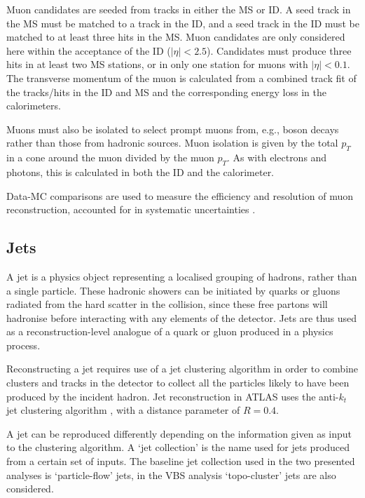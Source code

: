Muon candidates are seeded from tracks in either the \ac{MS} or \ac{ID}.  A seed
track in the \ac{MS} must be matched to a track in the \ac{ID}, and a seed track
in the \ac{ID} must be matched to at least three hits in the \ac{MS}.
Muon candidates are only considered here within the acceptance of the \ac{ID}
($|\eta| < 2.5$). Candidates must produce three hits in at least two \ac{MS}
stations, or in only one station for muons with $|\eta|<0.1$.
The transverse momentum of the muon is calculated from a combined track fit of the
tracks/hits in the \ac{ID} and \ac{MS} and the corresponding energy loss in the
calorimeters.

Muons must also be isolated to select prompt muons from, e.g., boson decays
rather than those from hadronic sources. Muon isolation is given by the total
$p_T$ in a cone around the muon divided by the muon $p_T$. As with electrons and
photons, this is calculated in both the \ac{ID} and the calorimeter.

Data-MC comparisons are used to measure the efficiency and
resolution of muon reconstruction, accounted for in systematic uncertainties
\cite{MuonReco2021}.


\subsection{Jets}
\label{sec:methods-reconstruction-jet}

A jet is a physics object representing a localised grouping of hadrons, rather
than a single particle. These hadronic showers can be initiated by quarks or
gluons radiated from the hard scatter in the collision, since these free partons
will hadronise before interacting with any elements of the detector. Jets are
thus used as a reconstruction-level analogue of a quark or gluon produced in a
physics process.

Reconstructing a jet requires use of a jet clustering algorithm in order to
combine clusters and tracks in the detector to collect all the particles likely
to have been produced by the incident hadron. Jet reconstruction in \ac{ATLAS}
uses the anti-$k_t$ jet clustering algorithm \cite{antikt}, with a distance
parameter of $R=0.4$.

A jet can be reproduced differently depending on the information given as input
to the clustering algorithm. A `jet collection' is the name used for jets
produced from a certain set of inputs. The baseline jet collection used in the
two presented analyses is `particle-flow' jets, in the \ac{VBS} analysis
`topo-cluster' jets are also considered.

